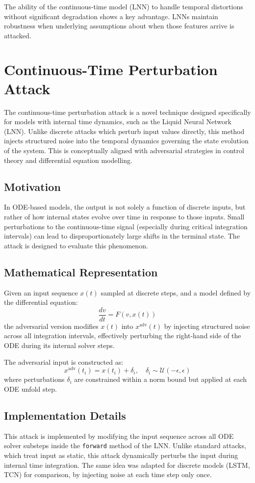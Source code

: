 The ability of the continuous-time model (LNN) to handle temporal distortions without significant degradation shows a key advantage. LNNs maintain robustness when underlying assumptions about when those features arrive is attacked.

\section{Continuous-Time Perturbation Attack}

The continuous-time perturbation attack is a novel technique designed specifically for models with internal time dynamics, such as the Liquid Neural Network (LNN). Unlike discrete attacks which perturb input values directly, this method injects structured noise into the temporal dynamics governing the state evolution of the system. This is conceptually aligned with adversarial strategies in control theory and differential equation modelling.

\subsection*{Motivation}
In ODE-based models, the output is not solely a function of discrete inputs, but rather of how internal states evolve over time in response to those inputs. Small perturbations to the continuous-time signal (especially during critical integration intervals) can lead to disproportionately large shifts in the terminal state. The attack is designed to evaluate this phenomenon.

\subsection*{Mathematical Representation}
Given an input sequence $x(t)$ sampled at discrete steps, and a model defined by the differential equation:
\[
\frac{dv}{dt} = F(v, x(t))
\]
the adversarial version modifies $x(t)$ into $x^{\text{adv}}(t)$ by injecting structured noise across all integration intervals, effectively perturbing the right-hand side of the ODE during its internal solver steps.

The adversarial input is constructed as:
\[
x^{\text{adv}}(t_i) = x(t_i) + \delta_i, \quad \delta_i \sim \mathcal{U}(-\epsilon, \epsilon)
\]
where perturbations $\delta_i$ are constrained within a norm bound but applied at each ODE unfold step.

\subsection*{Implementation Details}
This attack is implemented by modifying the input sequence across all ODE solver substeps inside the \texttt{forward} method of the LNN. Unlike standard attacks, which treat input as static, this attack dynamically perturbs the input during internal time integration. The same idea was adapted for discrete models (LSTM, TCN) for comparison, by injecting noise at each time step only once.

